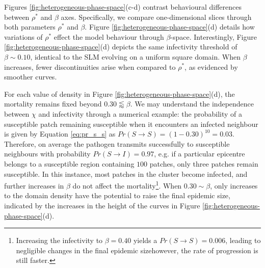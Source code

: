 Figures \ref{fig:heterogeneous-phase-space}(c-d) contrast behavioural differences between 
$\rho^*$ and $\beta$ axes. Specifically, we compare one-dimensional slices through both parameters $\rho^*$ and $\beta$.
Figure \ref{fig:heterogeneous-phase-space}(d) details how variations of $\rho^*$ effect the model behaviour through $\beta$-space. 
Interestingly, Figure \ref{fig:heterogeneous-phase-space}(d) depicts the same infectivity threshold of $\beta\sim0.10$, 
identical to the SLM evolving on a uniform square domain. When $\beta$ increases, fewer discontinuities arise when
compared to $\rho^*$, as evidenced by smoother curves. 

For each value of density in Figure \ref{fig:heterogeneous-phase-space}(d), 
the mortality remains fixed beyond $0.30 \lessapprox \beta$.
We may understand the independence between $\chi$ and infectivity through a numerical example:
the probability of a susceptible patch remaining susceptible when it encounters 
an infected neighbour is given by Equation \ref{eq:pr_s_s} as $Pr(S \rightarrow S) = (1 - 0.30)^{10} = 0.03$. 
Therefore, on average the pathogen transmits successfully to susceptible neighbours with probability $Pr(S\rightarrow I)=0.97$, 
e.g. if a particular epicentre belongs to a susceptible region containing $100$ patches, only three patches remain susceptible. 
In this instance, most patches in the cluster become infected, and further increases in $\beta$ do not affect the 
mortality\footnote{
Increasing the infectivity to $\beta=0.40$ yields a $Pr(S \rightarrow S) = 0.006$, 
leading to negligible changes in the final epidemic size\textemdash however, the rate of progression is still faster.
}. 
When $0.30 \sim \beta$, only increases to the domain density have the potential to raise the final epidemic size, 
indicated by the increases in the height of the curves in Figure \ref{fig:heterogeneous-phase-space}(d). 

